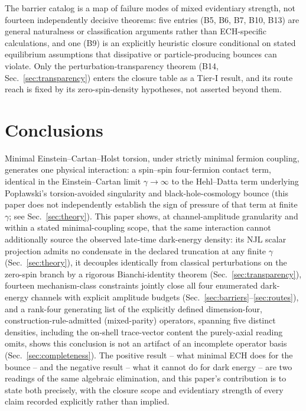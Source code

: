 \documentclass[aps,prd,twocolumn,superscriptaddress,preprintnumbers,nofootinbib,longbibliography,floatfix]{revtex4-2}
\begin{document}
The barrier catalog is a map of failure modes of mixed evidentiary
strength, not fourteen independently decisive theorems: five entries
(B5, B6, B7, B10, B13) are general naturalness or classification
arguments rather than ECH-specific calculations, and one (B9) is an
explicitly heuristic closure conditional on stated equilibrium
assumptions that dissipative or particle-producing bounces can violate.
Only the perturbation-transparency theorem (B14, Sec.~\ref{sec:transparency})
enters the closure table as a Tier-I result, and its route reach is
fixed by its zero-spin-density hypotheses, not asserted beyond them.

\section{Conclusions}\label{sec:conclusions}

Minimal Einstein--Cartan--Holst torsion, under strictly minimal fermion
coupling, generates one physical interaction: a spin--spin four-fermion
contact term, identical in the Einstein--Cartan limit $\gamma\to\infty$ to
the Hehl--Datta term underlying Pop{\l}awski's torsion-avoided singularity
and black-hole-cosmology bounce (this paper does not independently
establish the sign of pressure of that term at finite $\gamma$; see
Sec.~\ref{sec:theory}). This paper shows, at channel-amplitude
granularity and within a stated minimal-coupling scope, that the same
interaction cannot additionally source the observed late-time dark-energy
density: its NJL scalar projection admits no condensate in the declared
truncation at any finite $\gamma$ (Sec.~\ref{sec:theory}), it decouples
identically from classical perturbations on the zero-spin branch by a
rigorous Bianchi-identity theorem (Sec.~\ref{sec:transparency}), fourteen
mechanism-class constraints jointly close all four enumerated dark-energy
channels with explicit amplitude budgets (Sec.~\ref{sec:barriers}--\ref{sec:routes}),
and a rank-four generating list of the explicitly defined dimension-four,
construction-rule-admitted (mixed-parity) operators, spanning five
distinct densities, including the on-shell trace-vector content the
purely-axial reading omits, shows this conclusion is not an artifact of
an incomplete operator basis (Sec.~\ref{sec:completeness}). The positive
result -- what minimal ECH does for the bounce -- and the negative
result -- what it cannot do for dark energy -- are two readings of the
same algebraic elimination, and this paper's contribution is to state
both precisely, with the closure scope and evidentiary strength of every
claim recorded explicitly rather than implied.
\end{document}
